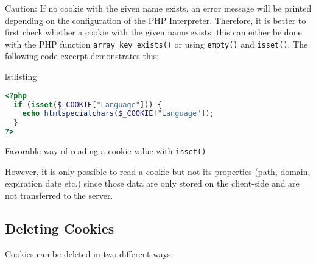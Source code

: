 \documentclass[a4paper, justified, notoc]{tufte-handout} %
\makeatletter
\newenvironment{listing}[1][htbp]
  {\ifvmode\else\unskip\fi\begin{@tufte@float}[#1]{lstlisting}{}}
  {\end{@tufte@float} } %
\makeatother
\begin{document}
Caution: If no cookie with the given name exists, an error message will be printed depending on the configuration of the PHP Interpreter. Therefore, it is better to first check whether a cookie with the given name exists; this can either be done with the PHP function \texttt{array\_key\_exists()} or using \texttt{empty()} and \texttt{isset()}. The following code excerpt demonstrates this:
\begin{listing}
\begin{lstlisting}[language=PHP]
<?php
  if (isset($_COOKIE["Language"])) {
    echo htmlspecialchars($_COOKIE["Language"]);
  }
?>
\end{lstlisting}
	\caption{Favorable way of reading a cookie value with \texttt{isset()}}
	\label{setting_cookies}
\end{listing}

However, it is only possible to read a cookie but not its properties (path, domain, expiration date etc.) since those data are only stored on the client-side and are not transferred to the server. 

\subsection{Deleting Cookies} %
\label{sub:deleting_cookies}

Cookies can be deleted in two different ways:
\end{document}
